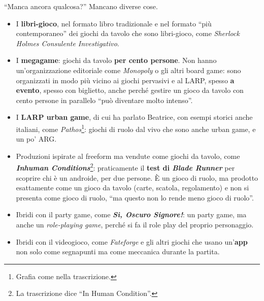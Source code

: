 ``Manca ancora qualcosa?'' Mancano diverse cose.
\begin{itemize}
  \item I \textbf{libri-gioco}, nel formato libro tradizionale e nel formato
        ``più contemporaneo'' dei giochi da tavolo che sono libri-gioco, come
        \emph{Sherlock Holmes Consulente Investigativo}.
  \item I \textbf{megagame}: giochi da tavolo \textbf{per cento persone}. Non
        hanno un'organizzazione editoriale come \emph{Monopoly} o gli altri
        board game: sono organizzati in modo più vicino ai giochi pervasivi e al
        LARP, spesso \textbf{a evento}, spesso con biglietto, anche perché
        gestire un gioco da tavolo con cento persone in parallelo ``può diventare
        molto intenso''.
  \item I \textbf{LARP urban game}, di cui ha parlato Beatrice, con esempi
        storici anche italiani, come \emph{Pathos}\footnote{Grafia come nella
        trascrizione.}: giochi di ruolo dal vivo che sono anche urban game, e
        un po' ARG.
  \item Produzioni ispirate al freeform ma vendute come giochi da tavolo, come
        \textbf{\emph{Inhuman Conditions}}\footnote{La trascrizione dice ``In
        Human Condition''.}: praticamente il \textbf{test di \emph{Blade Runner}}
        per scoprire chi è un androide, per due persone. È un gioco di ruolo, ma
        prodotto esattamente come un gioco da tavolo (carte, scatola,
        regolamento) e non si presenta come gioco di ruolo, ``ma questo non lo
        rende meno gioco di ruolo''.
  \item Ibridi con il party game, come \textbf{\emph{Sì, Oscuro Signore!}}: un
        party game, ma anche un \emph{role-playing game}, perché si fa il role
        play del proprio personaggio.
  \item Ibridi con il videogioco, come \emph{Fateforge} e gli altri giochi che
        usano un'\textbf{app} non solo come segnapunti ma come meccanica durante
        la partita.
\end{itemize}

